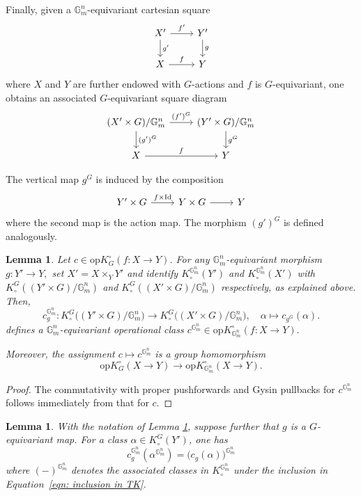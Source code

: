 \documentclass[12pt]{amsart}
\newcommand\G{\mathbb{G}}
\newcommand\Gm{\mathbb{G}_m}
\newcommand{\Kgroup}{K_{\circ}}
\newcommand{\opK}{\mathrm{op}K^{\circ}}
\newtheorem{Lemma}[theorem]{Lemma}
\theoremstyle{definition}
\begin{document}
Finally, given a $\Gm^n$-equivariant cartesian square \begin{equation*}
\begin{tikzcd}
X' \arrow[r, "f'"] \arrow[d, "g'"] & Y' \arrow[d, "g"] \\
X \arrow[r, "f"] & Y
\end{tikzcd}
\end{equation*}
where $X$ and $Y$ are further endowed with $G$-actions and $f$ is $G$-equivariant, one obtains an associated $G$-equivariant square diagram 
\[
\begin{tikzcd}
(X' \times G)/\Gm^n \arrow[r, "(f')^{G}"] \arrow[d, "(g')^{G}"] & (Y' \times G)/\Gm^n \arrow[d, "g^{G}"] \\
X \arrow[r, "f"] & Y
\end{tikzcd}
\]

The vertical map $g^G$ is induced by the composition
\[
\begin{tikzcd}
    Y' \times G \arrow[r,"f \times \mathrm{Id}"] & Y \times G \arrow[r] & Y    
\end{tikzcd}
\]
where the second map is the action map. The morphism $(g')^G$ is defined analogously.

\begin{Lemma}\label{lemma: T operational class}
Let $c \in \opK_{G}(f \colon X \to Y)$. For any $\Gm^n$-equivariant morphism
$
g \colon Y' \to Y,
$
set $X' = X \times_Y Y'$ and identify $\Kgroup^{\G_m^n}(Y')$ and $\Kgroup^{\G_m^n}(X')$ with $\Kgroup^{G}((Y' \times G)/\Gm^n)$ and $\Kgroup^{G}((X' \times G)/\Gm^n)$ respectively, as explained above. Then,
\[ 
c_g^{\Gm^n} \colon 
\Kgroup^{G}\big((Y' \times G)/\Gm^n\big) 
\longrightarrow 
\Kgroup^{G}\big((X' \times G)/\Gm^n\big), 
\quad
\alpha \longmapsto c_{g^{G}}(\alpha).
\]
defines a $\Gm^n$-equivariant operational class $ c^{\Gm^n} \in \opK_{\Gm^n}(f: X \to Y). $

Moreover, the assignment $c \mapsto c^{\Gm^n}$ is a group homomorphism
\[
\opK_{G}(X \to Y) \longrightarrow \opK_{\Gm^n}(X \to Y).
\]
\end{Lemma}

\begin{proof}
    The commutativity with proper pushforwards and Gysin pullbacks for $c^{\Gm^n}$ follows immediately from that for $c$.
\end{proof}

\begin{Lemma}\label{lemma: compatibility T vs GL}
    With the notation of Lemma \ref{lemma: T operational class}, suppose further that $g$ is a $G$-equivariant map. For a class $\alpha \in \Kgroup^{G}(Y')$, one has
    $$
    c_g^{\Gm^n}(\alpha^{\Gm^n})= \big( c_g(\alpha) \big)^{\Gm^n}
    $$
    where $(-)^{\Gm^n}$ denotes the associated classes in $\Kgroup^{\Gm^n}$ under the inclusion in Equation~\eqref{eqn: inclusion in TK}.
\end{Lemma}
\end{document}
